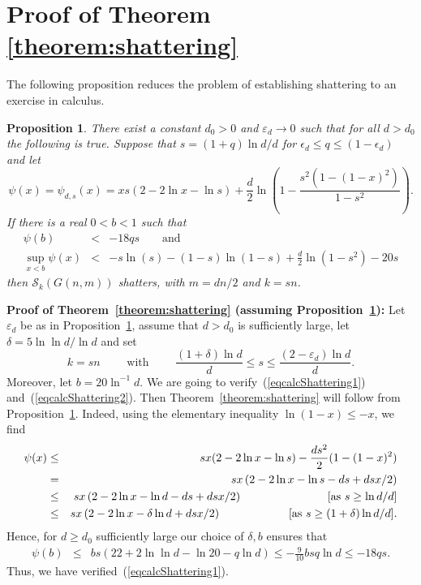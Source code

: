 \documentclass[a4paper,10pt]{article}
\newtheorem{proposition}{Proposition}\renewcommand{\theproposition}{\arabic{proposition}}
\newcommand\cS{\mathcal{S}}
\newcommand\eps{\varepsilon}
\newcommand\ra{\rightarrow}
\newcommand\bc[1]{\left({#1}\right)}
\newcommand\Prop{Proposition}
\newcommand\Thm{Theorem}
\begin{document}
\section{Proof of Theorem \ref{theorem:shattering}}\label{sec:theorem:shattering}


The following proposition reduces the problem of establishing shattering to an exercise in calculus.

\begin{proposition}\label{Prop_calcShattering}
There exist a constant $d_0>0$ and $\eps_d\ra0$ such that for all
$d>d_0$ the following is true. Suppose that $s=(1+q)\ln d/d$  for
$\epsilon_d\leq q\leq (1-\epsilon_d)$ and let
	$$\psi(x)=\psi_{d,s}(x)=xs(2-2\ln x-\ln s)+\frac d2\ln\bc{1-\frac{s^2(1-(1-x)^2)}{1-s^2}}.$$
If there is a real $0<b<1$ such that
	\begin{eqnarray}\label{eqcalcShattering1}
	\psi(b)&<&-18qs\qquad\mbox{and}\\
	\sup_{x<b}\psi(x)&<&-s\ln(s)-(1-s)\ln(1-s)+\frac{d}2\ln(1-s^2)-20s\label{eqcalcShattering2}
	\end{eqnarray}
then $\cS_k(G(n,m))$ shatters, with $m=dn/2$ and $k=sn$.
\end{proposition}

\noindent
{\bf Proof of \Thm~\ref{theorem:shattering} (assuming \Prop~\ref{Prop_calcShattering}):}
Let $\eps_d$ be as in \Prop~\ref{Prop_calcShattering}, assume that $d>d_0$ is sufficiently large,
let $\delta=5\ln\ln d/\ln d$ and set
	$$k=sn\qquad\mbox{ with }\qquad\frac{(1+\delta)\ln d}d\leq s\leq\frac{(2-\eps_d)\ln d}d.$$
Moreover, let $b=20\ln^{-1}d$.
We are going to verify~(\ref{eqcalcShattering1}) and~(\ref{eqcalcShattering2}).
Then \Thm~\ref{theorem:shattering} will follow from \Prop~\ref{Prop_calcShattering}.
Indeed, using the elementary inequality $\ln(1-x)\leq-x$, we find
	\begin{eqnarray}
	\psi(x)&\leq&sx(2-2\ln x-\ln s)-\frac {ds^2}2(1-(1-x)^2)\nonumber\\
		&=&sx\bc{2-2\ln x-\ln s-ds+dsx/2}\nonumber\\
		&\leq&sx\bc{2-2\ln x-\ln d-ds+dsx/2}\hspace*{2.65cm}\mbox{[as $s\geq\ln d/d$]}\nonumber\\
		&\leq&sx\bc{2-2\ln x-\delta\ln d+dsx/2}\hspace*{2.1cm}\mbox{[as $s\geq(1+\delta)\ln d/d$]}.
			\label{eqpftheorem:shattering1}
	\end{eqnarray}
Hence, for $d\geq d_0$ sufficiently large our choice of $\delta,b$ ensures that
	\begin{eqnarray*}
\psi(b)&\leq & b s\left(22+2\ln\ln d-\ln20-q\ln d\right)\leq -\frac{9}{10}bsq\ln d\leq -18qs. 
	\end{eqnarray*}
Thus, we have verified~(\ref{eqcalcShattering1}).
\end{document}
